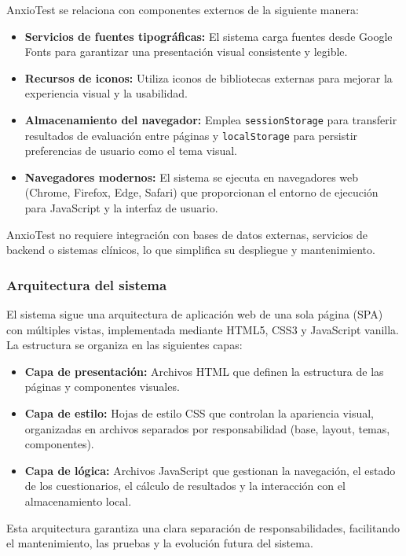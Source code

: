AnxioTest se relaciona con componentes externos de la siguiente manera:

\begin{itemize}
  \item \textbf{Servicios de fuentes tipográficas:} El sistema carga fuentes desde Google Fonts para garantizar una presentación visual consistente y legible.
  \item \textbf{Recursos de iconos:} Utiliza iconos de bibliotecas externas para mejorar la experiencia visual y la usabilidad.
  \item \textbf{Almacenamiento del navegador:} Emplea \texttt{sessionStorage} para transferir resultados de evaluación entre páginas y \texttt{localStorage} para persistir preferencias de usuario como el tema visual.
  \item \textbf{Navegadores modernos:} El sistema se ejecuta en navegadores web (Chrome, Firefox, Edge, Safari) que proporcionan el entorno de ejecución para JavaScript y la interfaz de usuario.
\end{itemize}

AnxioTest no requiere integración con bases de datos externas, servicios de backend o sistemas clínicos, lo que simplifica su despliegue y mantenimiento.

\subsubsection{Arquitectura del sistema}

El sistema sigue una arquitectura de aplicación web de una sola página (SPA) con múltiples vistas, implementada mediante HTML5, CSS3 y JavaScript vanilla. La estructura se organiza en las siguientes capas:

\begin{itemize}
  \item \textbf{Capa de presentación:} Archivos HTML que definen la estructura de las páginas y componentes visuales.
  \item \textbf{Capa de estilo:} Hojas de estilo CSS que controlan la apariencia visual, organizadas en archivos separados por responsabilidad (base, layout, temas, componentes).
  \item \textbf{Capa de lógica:} Archivos JavaScript que gestionan la navegación, el estado de los cuestionarios, el cálculo de resultados y la interacción con el almacenamiento local.
\end{itemize}

Esta arquitectura garantiza una clara separación de responsabilidades, facilitando el mantenimiento, las pruebas y la evolución futura del sistema.

